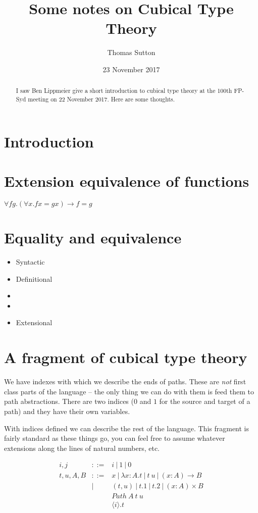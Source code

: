 \documentclass[a4paper]{article}
\title{Some notes on Cubical Type Theory}
\author{Thomas Sutton}
\date{23 November 2017}
\newcommand{\fun}[3]{(#1 : #2) \rightarrow #3}
\newcommand{\labs}[3]{\lambda #1 : #2. #3}
\newcommand{\lapp}[2]{#1 \: #2}
\newcommand{\pair}[2]{(#1 , #2)}
\newcommand{\lprj}[1]{#1.1}
\newcommand{\rprj}[1]{#1.2}
\newcommand{\dprod}[3]{(#1 : #2) \times #3}
\newcommand{\pabs}[2]{{\langle #1 \rangle}.{#2}}
\newcommand{\Path}[3]{{Path\:{#1}\:{#2}\:{#3}}}
\newcommand{\alt}{\: | \:}
\begin{document}
\maketitle
\begin{abstract}
I saw Ben Lippmeier give a short introduction to cubical type theory
\cite{DBLP:journals/corr/CohenCHM16} at the 100th FP-Syd meeting on 22 November
2017. Here are some thoughts.
\end{abstract}

\section{Introduction}

\section{Extension equivalence of functions}

$\forall f g. (\forall x. f x = g x) \rightarrow f = g$

\section{Equality and equivalence}

\begin{itemize}
\item Syntactic
\item Definitional
\item
\item
\item Extensional
\end{itemize}

\section{A fragment of cubical type theory}

We have indexes with which we describe the ends of paths. These are
{\em not} first class parts of the language -- the only thing we can
do with them is feed them to path abstractions. There are two indices
($0$ and $1$ for the source and target of a path) and they have their
own variables.

With indices defined we can describe the rest of the language. This
fragment is fairly standard as these things go, you can feel free to
assume whatever extensions along the lines of natural numbers, etc.

\begin{align*}
  i,j     &::=&i \alt 1 \alt 0\\
  t,u,A,B &::=&x \alt \labs{x}{A}{t} \alt \lapp{t}{u} \alt \fun{x}{A}{B}\\
          &|  &\pair{t}{u} \alt \lprj{t} \alt \rprj{t} \alt \dprod{x}{A}{B} \\
          &   &\Path{A}{t}{u}\\
          &   &\pabs{i}{t}\\
\end{align*}
\end{document}
